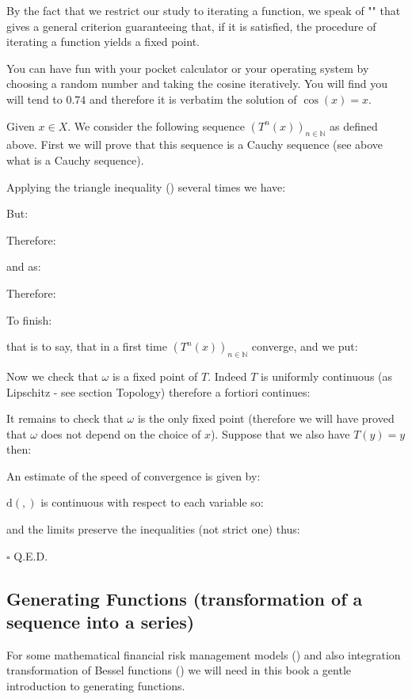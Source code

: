 	By the fact that we restrict our study to iterating a function, we speak of "" that gives a general criterion guaranteeing that, if it is satisfied, the procedure of iterating a function yields a fixed point.
	\begin{tcolorbox}[title=Remarks,colframe=black,arc=10pt]
	You can have fun with your pocket calculator or your operating system by choosing a random number and taking the cosine iteratively. You will find you will tend to $0.74$ and therefore it is verbatim the solution of $\cos (x) = x$.
	\end{tcolorbox}
	\begin{dem}
	Given $x\in X$. We consider the following sequence $(T^n(x))_{n\in \mathbb{N}}$ as defined above. First we will prove that this sequence is a Cauchy sequence (see above what is a Cauchy sequence).

	Applying the triangle inequality () several times we have:
	
	But:
	
	Therefore:
	
	and as:
	
	Therefore:
	
	To finish:
	
	that is to say, that in a first time $(T^n(x))_{n\in \mathbb{N}}$ converge, and we put:
	
	Now we check that $\omega$ is a fixed point of $T$. Indeed $T$ is uniformly continuous (as Lipschitz - see section Topology) therefore a fortiori continues:
	
	It remains to check that $\omega$ is the only fixed point (therefore we will have proved that $\omega$ does not depend on the choice of $x$). Suppose that we also have $T(y)=y$ then:
	
	An estimate of the speed of convergence is given by:
	
	$\mathrm{d}(,)$ is continuous with respect to each variable so:
	
	and the limits preserve the inequalities (not strict one) thus:
	
	\begin{flushright}
		$\square$  Q.E.D.
	\end{flushright}
	\end{dem}
	
	\subsection{Generating Functions (transformation of a sequence into a series)}
	For some mathematical financial risk management models () and also integration transformation of Bessel functions () we will need in this book a gentle introduction to generating functions.
	
